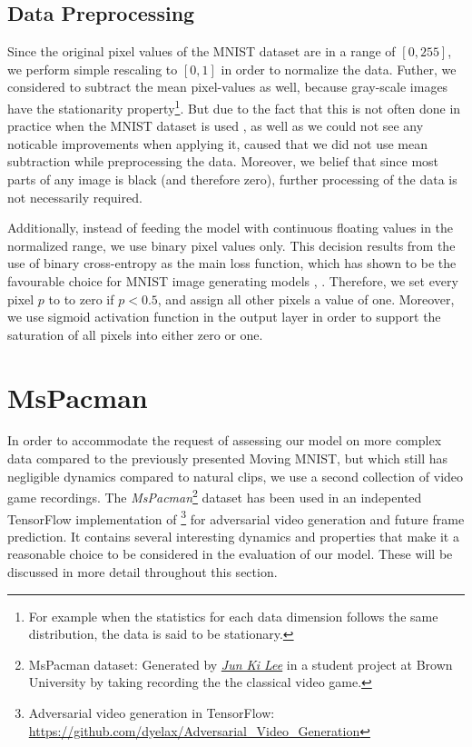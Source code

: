 \subsection{Data Preprocessing}

Since the original pixel values of the MNIST dataset are in a range of $[0, 255]$, we perform simple rescaling to $[0, 1]$ in order to normalize the data. Futher, we considered to subtract the mean pixel-values as well, because gray-scale images have the stationarity property\footnote{For example when the statistics for each data dimension follows the same distribution, the data is said to be stationary.}. But due to the fact that this is not often done in practice when the MNIST dataset is used \parencite{stanford_data_pre}, as well as we could not see any noticable improvements when applying it, caused that we did not use mean subtraction while preprocessing the data. Moreover, we belief that since most parts of any image is black (and therefore zero), further processing of the data is not necessarily required.

Additionally, instead of feeding the model with continuous floating values in the normalized range, we use binary pixel values only. This decision results from the use of binary cross-entropy as the main loss function, which has shown to be the favourable choice for MNIST image generating models \parencite{unsup_learn_lstm}, \parencite{conv_lstm_nowcasting}. Therefore, we set every pixel $p$ to to zero if $p < 0.5 $, and assign all other pixels a value of one. Moreover, we use sigmoid activation function in the output layer in order to support the saturation of all pixels into either zero or one.

\section{MsPacman} \label{sec:ds_pac}

In order to accommodate the request of assessing our model on more complex data compared to the previously presented Moving MNIST, but which still has negligible dynamics compared to natural clips, we use a second collection of video game recordings. The \textit{MsPacman}\footnote{MsPacman dataset: Generated by \href{mailto:jun_ki_lee@brown.edu}{\textit{Jun Ki Lee}} in a student project at Brown University by taking recording the the classical video game.} dataset has been used in an indepented TensorFlow implementation of \parencite{deep_multiscale_video_pred}\footnote{Adversarial video generation in TensorFlow:\\ \url{https://github.com/dyelax/Adversarial_Video_Generation}} for adversarial video generation and future frame prediction. It contains several interesting dynamics and properties that make it a reasonable choice to be considered in the evaluation of our model. These will be discussed in more detail throughout this section.

